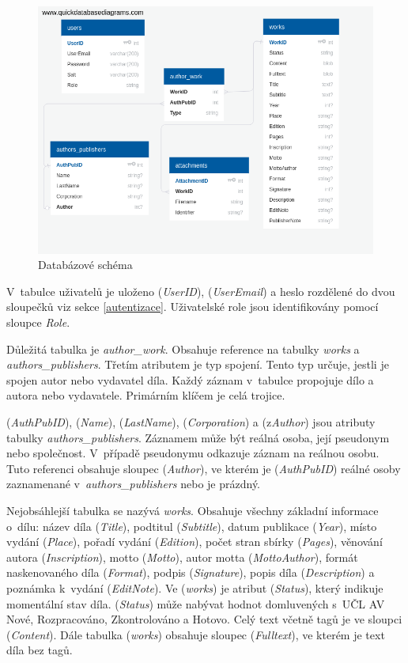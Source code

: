         \begin {figure}[H]\centering
            \includegraphics[width=\textwidth]{images/schema}
            \caption {Databázové schéma}
            \label {fig:schema}
        \end{figure}
        
        V~tabulce uživatelů je uloženo (\textit{UserID}), (\textit{UserEmail}) a heslo rozdělené do dvou sloupečků viz sekce \ref{autentizace}. Uživatelské role jsou identifikovány pomocí sloupce \textit{Role}.
        
        Důležitá tabulka je \textit{author\_work}. Obsahuje reference na tabulky \textit{works} a \textit{authors\_publishers}. Třetím atributem je typ spojení. Tento typ určuje, jestli je spojen autor nebo vydavatel díla. Každý záznam v~tabulce propojuje dílo a autora nebo vydavatele. Primárním klíčem je celá trojice.
        
        (\textit{AuthPubID}), (\textit{Name}), (\textit{LastName}), (\textit{Corporation}) a (z\textit{Author}) jsou atributy tabulky \textit{authors\_publishers}. Záznamem může být reálná osoba, její pseudonym nebo společnost. V~případě pseudonymu odkazuje záznam na reálnou osobu. Tuto referenci obsahuje sloupec (\textit{Author}), ve kterém je (\textit{AuthPubID}) reálné osoby zaznamenané v~\textit{authors\_publishers} nebo je prázdný.
        
        Nejobsáhlejší tabulka se nazývá \textit{works}. Obsahuje všechny základní informace o~dílu: název díla (\textit{Title}), podtitul (\textit{Subtitle}), datum publikace (\textit{Year}), místo vydání (\textit{Place}), pořadí vydání (\textit{Edition}), počet stran sbírky (\textit{Pages}), věnování autora (\textit{Inscription}), motto (\textit{Motto}), autor motta (\textit{MottoAuthor}), formát naskenovaného díla (\textit{Format}), podpis (\textit{Signature}), popis díla (\textit{Description}) a poznámka k~vydání (\textit{EditNote}). Ve (\textit{works}) je atribut (\textit{Status}), který indikuje momentální stav díla. (\textit{Status}) může nabývat hodnot domluvených s~UČL AV Nové, Rozpracováno, Zkontrolováno a Hotovo. Celý text včetně tagů je ve sloupci (\textit{Content}). Dále tabulka (\textit{works}) obsahuje sloupec (\textit{Fulltext}), ve kterém je text díla bez tagů.
        
